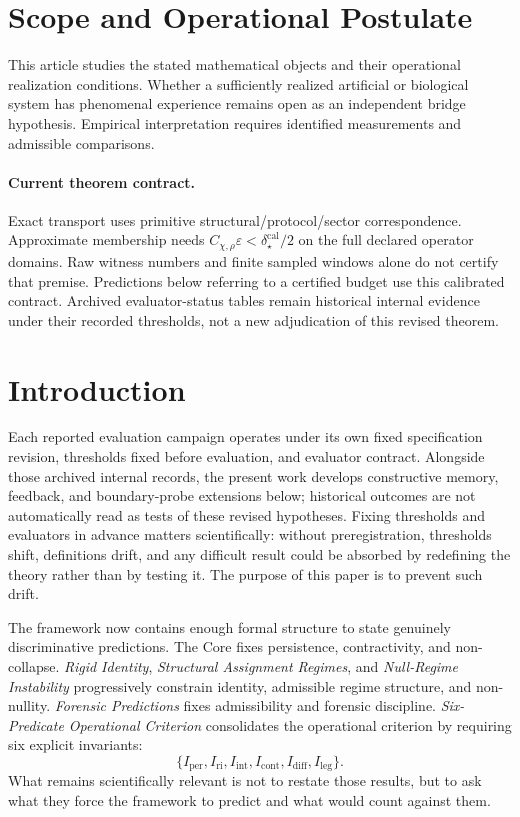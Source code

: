 \documentclass[11pt,a4paper]{article}
\newcommand{\Iper}{I_{\mathrm{per}}}
\newcommand{\Iri}{I_{\mathrm{ri}}}
\newcommand{\Iint}{I_{\mathrm{int}}}
\newcommand{\Icont}{I_{\mathrm{cont}}}
\newcommand{\Idiff}{I_{\mathrm{diff}}}
\newcommand{\Ileg}{I_{\mathrm{leg}}}
\begin{document}
\section*{Scope and Operational Postulate}
This article studies the stated mathematical objects and their operational
realization conditions. Whether a sufficiently realized artificial or biological
system has phenomenal experience remains open as an independent bridge
hypothesis. Empirical interpretation requires identified measurements and
admissible comparisons.

\paragraph{Current theorem contract.}
Exact transport uses primitive structural/protocol/sector correspondence. Approximate membership needs $C_{\chi,\rho}\varepsilon<\delta_\star^{\mathrm{cal}}/2$ on the full declared operator domains. Raw witness numbers and finite sampled windows alone do not certify that premise. Predictions below referring to a certified budget use this calibrated contract. Archived evaluator-status tables remain historical internal evidence under their recorded thresholds, not a new adjudication of this revised theorem.

\section{Introduction}
Each reported evaluation campaign operates under its own fixed specification revision, thresholds fixed before evaluation, and evaluator contract. Alongside those archived internal records, the present work develops constructive memory, feedback, and boundary-probe extensions below; historical outcomes are not automatically read as tests of these revised hypotheses. Fixing thresholds and evaluators in advance matters scientifically: without preregistration, thresholds shift, definitions drift, and any difficult result could be absorbed by redefining the theory rather than by testing it. The purpose of this paper is to prevent such drift.

The framework now contains enough formal structure to state genuinely discriminative predictions. The Core fixes persistence, contractivity, and non-collapse. \textit{Rigid Identity}, \textit{Structural Assignment Regimes}, and \textit{Null-Regime Instability} progressively constrain identity, admissible regime structure, and non-nullity. \textit{Forensic Predictions} fixes admissibility and forensic discipline. \textit{Six-Predicate Operational Criterion} consolidates the operational criterion by requiring six explicit invariants:
\[
\{\Iper,\Iri,\Iint,\Icont,\Idiff,\Ileg\}.
\]
What remains scientifically relevant is not to restate those results, but to ask what they force the framework to predict and what would count against them.
\end{document}
